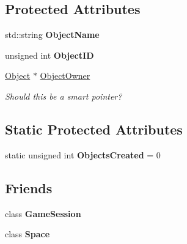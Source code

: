\subsection*{Protected Attributes}
\begin{DoxyCompactItemize}
\item 
\hypertarget{classDCEngine_1_1Object_a440163a8989e388a015e84917d91e875}{std\-::string {\bfseries Object\-Name}}\label{classDCEngine_1_1Object_a440163a8989e388a015e84917d91e875}

\item 
\hypertarget{classDCEngine_1_1Object_a5f0a32912d3ddc6c5c52c2b913e239e2}{unsigned int {\bfseries Object\-I\-D}}\label{classDCEngine_1_1Object_a5f0a32912d3ddc6c5c52c2b913e239e2}

\item 
\hypertarget{classDCEngine_1_1Object_aed58c8254a35a50f73957178aa81552e}{\hyperlink{classDCEngine_1_1Object}{Object} $\ast$ \hyperlink{classDCEngine_1_1Object_aed58c8254a35a50f73957178aa81552e}{Object\-Owner}}\label{classDCEngine_1_1Object_aed58c8254a35a50f73957178aa81552e}

\begin{DoxyCompactList}\small\item\em Should this be a smart pointer? \end{DoxyCompactList}\end{DoxyCompactItemize}
\subsection*{Static Protected Attributes}
\begin{DoxyCompactItemize}
\item 
\hypertarget{classDCEngine_1_1Object_a540aa2e15f0aa2df7e9f0205984487ca}{static unsigned int {\bfseries Objects\-Created} = 0}\label{classDCEngine_1_1Object_a540aa2e15f0aa2df7e9f0205984487ca}

\end{DoxyCompactItemize}
\subsection*{Friends}
\begin{DoxyCompactItemize}
\item 
\hypertarget{classDCEngine_1_1Object_a457986e85a61e428e7f0a7350202e9d4}{class {\bfseries Game\-Session}}\label{classDCEngine_1_1Object_a457986e85a61e428e7f0a7350202e9d4}

\item 
\hypertarget{classDCEngine_1_1Object_a2129e6c0ac73536a2ac4f681dae16947}{class {\bfseries Space}}\label{classDCEngine_1_1Object_a2129e6c0ac73536a2ac4f681dae16947}

\end{DoxyCompactItemize}


